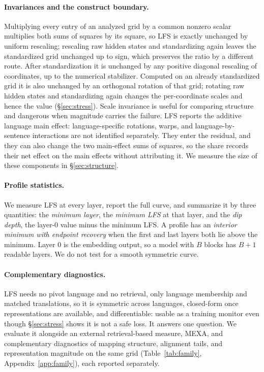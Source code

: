 \documentclass{article} %
\begin{document}
\paragraph{Invariances and the construct boundary.} Multiplying every entry of an analyzed grid by a common nonzero scalar multiplies both sums of squares by its square, so LFS is exactly unchanged by uniform rescaling; rescaling raw hidden states and standardizing again leaves the standardized grid unchanged up to sign, which preserves the ratio by a different route. After standardization it is unchanged by any positive diagonal rescaling of coordinates, up to the numerical stabilizer. Computed on an already standardized grid it is also unchanged by
an orthogonal rotation of that grid; rotating raw hidden states and
standardizing again changes the per-coordinate scales and hence the value
(\S\ref{sec:stress}). Scale invariance is useful for comparing structure and
dangerous when magnitude carries the failure. LFS reports the additive
language main effect: language-specific rotations, warps, and
language-by-sentence interactions are not identified separately. They enter
the residual, and they can also change the two main-effect sums of squares,
so the share records their net effect on the main effects without attributing
it. We measure the size of these components in \S\ref{sec:structure}.

\paragraph{Profile statistics.} We measure LFS at every layer, report the full curve, and summarize it by three quantities: the \emph{minimum layer}, the \emph{minimum LFS} at that layer, and the \emph{dip depth}, the layer-0 value minus the minimum LFS. A profile has an \emph{interior minimum with endpoint recovery} when the first and last layers both lie above the minimum. Layer 0 is the embedding output, so a model with $B$ blocks has $B+1$ readable layers. We do not test for a smooth symmetric curve.

\paragraph{Complementary diagnostics.} LFS needs no pivot language and no retrieval, only language membership and matched translations, so it is symmetric across languages, closed-form once representations are available, and differentiable: usable as a training monitor even though \S\ref{sec:stress} shows it is not a safe loss. It answers one question. We evaluate it alongside an external retrieval-based measure, MEXA, and complementary diagnostics of mapping structure, alignment tails, and representation magnitude on the same grid (Table~\ref{tab:family}, Appendix~\ref{app:family}), each reported separately.
\end{document}
